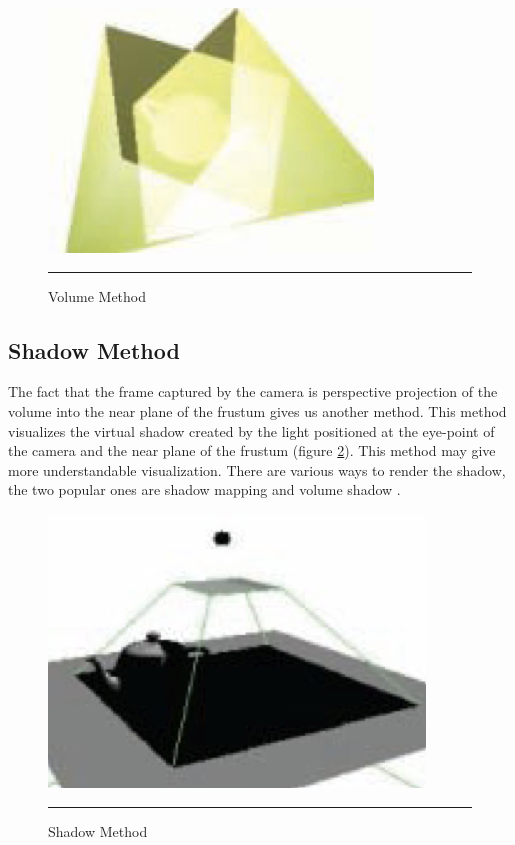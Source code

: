 \begin{figure}[htbp]
	\centering
	\includegraphics{./Primitives/theory_volume.png}
	\rule{35em}{0.5pt}
	\caption[Volume Method]{Volume Method}
	\label{fig:VolumeMethod}
\end{figure}

\subsection{Shadow Method}

The fact that the frame captured by the camera is perspective projection of the volume into the near plane of the frustum gives us another method. This method visualizes the virtual shadow created by the light positioned at the eye-point of the camera and the near plane of the frustum (figure \ref{fig:ShadowMethod}). This method may give more understandable visualization. There are various ways to render the shadow, the two popular ones are shadow mapping \cite{Reference7} \cite{Reference8} and volume shadow \cite{Reference9}.

\begin{figure}[htbp]
	\centering
	\includegraphics{./Primitives/theory_shadow.png}
	\rule{35em}{0.5pt}
	\caption[Shadow Method]{Shadow Method}
	\label{fig:ShadowMethod}
\end{figure}

